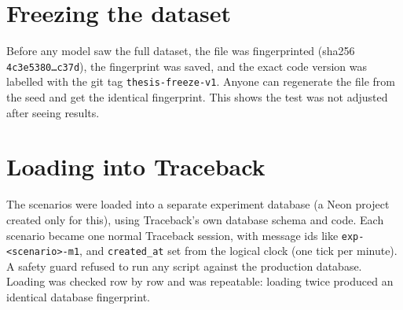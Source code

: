 \section{Freezing the dataset}

\begin{plain}
Before any model saw the full dataset, the file was fingerprinted (sha256 \texttt{4c3e5380\dots c37d}), the fingerprint was saved, and the exact code version was labelled with the git tag \texttt{thesis-freeze-v1}. Anyone can regenerate the file from the seed and get the identical fingerprint. This shows the test was not adjusted after seeing results.
\end{plain}

\section{Loading into Traceback}

The scenarios were loaded into a separate experiment database (a Neon project created only for this), using Traceback's own database schema and code. Each scenario became one normal Traceback session, with message ids like \texttt{exp-<scenario>-m1}, and \texttt{created\_at} set from the logical clock (one tick per minute). A safety guard refused to run any script against the production database. Loading was checked row by row and was repeatable: loading twice produced an identical database fingerprint.
